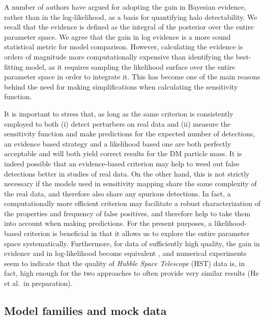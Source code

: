 \documentclass[a4paper, fleqn, usenatbib, useAMS]{mnras}
\begin{document}
A number of authors \citep[e.g.][]{Vegetti2018,Ritondale2019} have
argued for adopting the gain in Bayesian evidence, rather than in the log-likelihood, 
as a basis for quantifying halo detectability. 
We recall that the evidence is defined as the integral of the posterior over the entire parameter space.
We agree that the gain in log evidence is a more sound statistical metric for model 
comparison. However, calculating the evidence is orders of magnitude more computationally expensive than identifying the best-fitting model, as it requires  sampling the likelihood surface over the entire parameter space in order to integrate it. This has  become one of the main reasons behind the need for making simplifications when calculating 
the sensitivity function.

It is important to stress that, as long as the same criterion is consistently employed to 
both (i) detect perturbers on real data and (ii) measure the sensitivity function and make predictions for the expected number of detections, an evidence based strategy and a likelihood based one are both
perfectly acceptable and will both yield correct results for the DM particle mass.  
It is indeed possible that an evidence-based criterion may help to weed out false detections better in studies of real data. On the other hand, this is not strictly necessary
{if the models used in sensitivity mapping share the same complexity of the real data, and therefore also share any spurious detections}. In fact, a computationally more efficient criterion may facilitate a robust characterization of the properties and frequency of false positives, and therefore help to take them into account when 
making predictions. 
For the present purposes, 
a likelihood-based criterion is beneficial in that it allows us to explore the entire parameter space systematically. Furthermore, for data of sufficiently high quality, the gain in evidence and in log-likelihood
become equivalent \citep[{as embodied by the BIC,} see e.g.][]{ESLII, ICSM}, and numerical experiments seem to indicate that
the quality of {\it Hubble Space Telescope} (HST) data is, in fact, high enough for the two approaches to often provide very 
similar results (He et al.\ in preparation).



\subsection{Model families and mock data}
\end{document}
